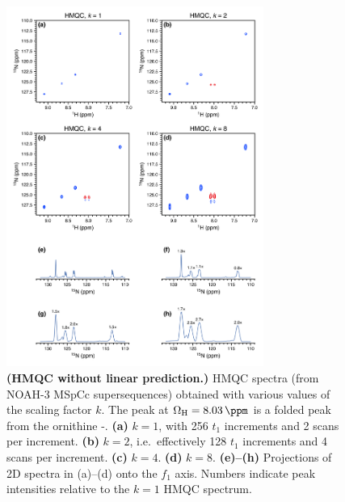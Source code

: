 \begin{figure}
    \centering
    \includegraphics[width=0.75\textwidth]{./figures/hmqc_kscale.png}
    \caption{
        \textbf{(HMQC without linear prediction.)}
        \nitrogen{} HMQC spectra (from NOAH-3 MSpCc supersequences) obtained with various values of the scaling factor $k$.
        The peak at $\Omega_{\ce{H}} = \SI{8.03}{\ppm}$ is a folded peak from the ornithine \textdelta-.
        \textbf{(a)} $k = 1$, with 256 $t_1$ increments and 2 scans per increment.
        \textbf{(b)} $k = 2$, i.e.\ effectively 128 $t_1$ increments and 4 scans per increment.
        \textbf{(c)} $k = 4$.
        \textbf{(d)} $k = 8$.
        \textbf{(e)--(h)} Projections of 2D spectra in (a)--(d) onto the $f_1$ axis.
        Numbers indicate peak intensities relative to the $k = 1$ HMQC spectrum.
        \grami{}
    }
    \label{fig:hmqc_kscale}
\end{figure}

